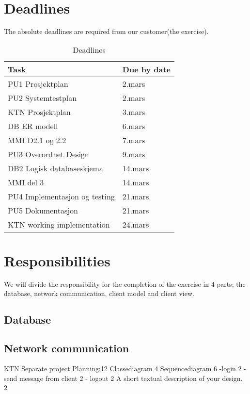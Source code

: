 \documentclass[a4paper, english, 12pt]{article}
\begin{document}
\section{Deadlines}
The absolute deadlines are required from our customer(the exercise). 
\begin{table}[h]
    \begin{center}
    \caption{Deadlines} 
    \label{deadline}
    \vspace{0,5cm}
    \begin{tabular}{| l | l |}  
        \hline
        Task & Due by date \\
        \hline 
    PU1  Prosjektplan & 2.mars \\
    PU2  Systemtestplan & 2.mars\\
    KTN  Prosjektplan & 3.mars\\
    DB   ER modell& 6.mars\\
    MMI  D2.1 og 2.2 & 7.mars\\
    PU3  Overordnet Design & 9.mars\\
    DB2  Logisk databaseskjema & 14.mars\\
    MMI  del 3 & 14.mars\\
    PU4  Implementasjon og testing & 21.mars\\
    PU5  Dokumentasjon & 21.mars\\
    KTN  working implementation & 24.mars\\
        \hline
    \end{tabular}
    \end{center}
\end{table}



\section{Responsibilities}
We will divide the responsibility for the completion of the exercise in 4 parts; the database, network communication, 
client model and client view. 
\subsection{Database}

\subsection{Network communication}

KTN Separate project
Planning:12
	Classediagram 4
	Sequencediagram 6
		-login 2
		- send message from client 2
		- logout 2
	A short textual description of your design. 2
\end{document}
